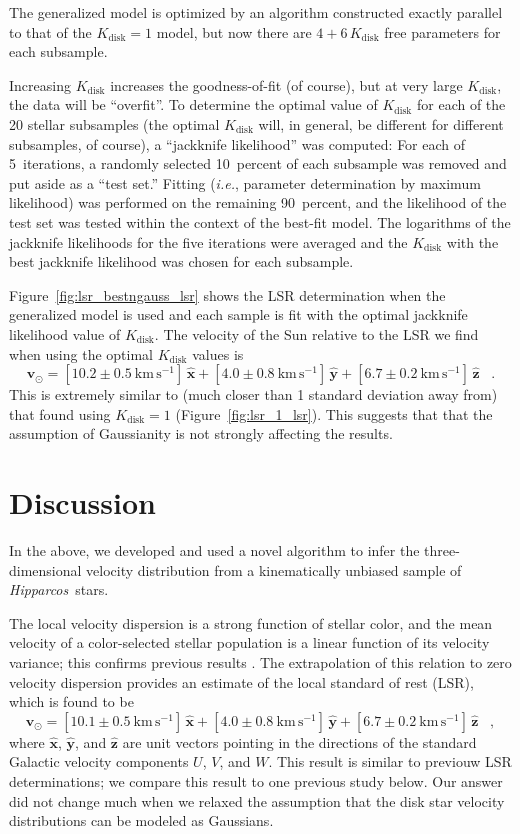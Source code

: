 \documentclass[12pt,preprint]{aastex}
\newcommand{\latin}[1]{\textit{#1}}
\newcommand{\eg}{\latin{e.g.}}
\newcommand{\ie}{\latin{i.e.}}
\newcommand{\Hipparcos}{\textit{Hipparcos}}
\renewcommand{\vec}[1]{\mathbf{#1}} %
\newcommand{\vv}{\vec{v}}
\newcommand{\eex}{\vec{\hat{x}}}
\newcommand{\eey}{\vec{\hat{y}}}
\newcommand{\eez}{\vec{\hat{z}}}
\newcommand{\Kdisk}{K_\mathrm{disk}}
\newcommand{\vvsun}{\vv_\odot}
\begin{document}
The generalized model is optimized by an algorithm constructed exactly
parallel to that of the $\Kdisk=1$ model, but now there are
$4+6\,\Kdisk$ free parameters for each subsample.

Increasing $\Kdisk$ increases the goodness-of-fit (of course), but at
very large $\Kdisk$, the data will be ``overfit''.  To determine the
optimal value of $\Kdisk$ for each of the 20 stellar subsamples (the
optimal $\Kdisk$ will, in general, be different for different
subsamples, of course), a ``jackknife likelihood'' was computed: For
each of 5~iterations, a randomly selected 10~percent of each subsample
was removed and put aside as a ``test set.''  Fitting (\ie, parameter
determination by maximum likelihood) was performed on the remaining
90~percent, and the likelihood of the test set was tested within the
context of the best-fit model.  The logarithms of the jackknife
likelihoods for the five iterations were averaged and the $\Kdisk$
with the best jackknife likelihood was chosen for each subsample.

Figure~\ref{fig:lsr_bestngauss_lsr} shows the LSR determination when
the generalized model is used and each sample is fit with the optimal
jackknife likelihood value of $\Kdisk$.  The velocity of the Sun
relative to the LSR we find when using the optimal $\Kdisk$ values is
\begin{equation}
\vvsun = [10.2\pm0.5~\mathrm{km\,s^{-1}}]\,\eex
       + [ 4.0\pm0.8~\mathrm{km\,s^{-1}}]\,\eey
       + [ 6.7\pm0.2~\mathrm{km\,s^{-1}}]\,\eez \;\;\;.
\end{equation}
This is extremely similar to (much closer than 1 standard deviation
away from) that found using $\Kdisk=1$ (Figure~\ref{fig:lsr_1_lsr}).
This suggests that that the assumption of Gaussianity is not strongly
affecting the results.

\section{Discussion}

In the above, we developed and used a novel algorithm to infer the
three-dimensional velocity distribution from a kinematically unbiased
sample of \Hipparcos\ stars.

The local velocity dispersion is a strong function of stellar color,
and the mean velocity of a color-selected stellar population is a
linear function of its velocity variance; this confirms previous
results \citep[\eg, ][]{dehnen98a}.  The extrapolation of this
relation to zero velocity dispersion provides an estimate of the local
standard of rest (LSR), which is found to be
\begin{equation}
\vvsun = [10.1\pm0.5~\mathrm{km\,s^{-1}}]\,\eex
       + [ 4.0\pm0.8~\mathrm{km\,s^{-1}}]\,\eey
       + [ 6.7\pm0.2~\mathrm{km\,s^{-1}}]\,\eez \;\;\;,
\end{equation}
where $\eex$, $\eey$, and $\eez$ are unit vectors pointing in the
directions of the standard Galactic velocity components $U$, $V$, and
$W$.  This result is similar to previouw LSR determinations; we
compare this result to one previous study below.  Our answer did not
change much when we relaxed the assumption that the disk star velocity
distributions can be modeled as Gaussians.
\end{document}
